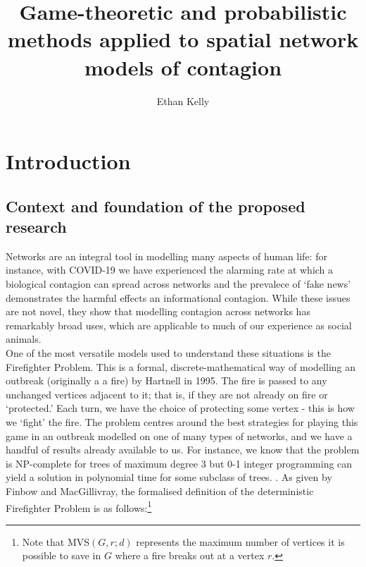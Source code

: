 \documentclass[hidelinks,a4paper,11pt]{article}
\makeatletter
\numberwithin{equation}{section}
\def\@supervisor{Dr Jessica Enright}
\newcommand{\supervisor}[1]{
  \def\@supervisor{#1}
}
\def\@studentid{}
\newcommand{\studentid}[1]{
  \def\@studentid{#1}
}
\makeatother
\begin{document}

\title{Game-theoretic and probabilistic methods applied to spatial network models of contagion}
\author{Ethan Kelly}
\supervisor{Dr Jessica Enright}
\studentid{2295664K@student.gla.ac.uk}




\newpage
{}

\section{Introduction}
\label{sec:intro}

\subsection{Context and foundation of the proposed research}

Networks are an integral tool in modelling many aspects of human life: for instance, with COVID-19 we have experienced the alarming rate at which a biological contagion can spread across networks and the prevalece of `fake news' demonstrates the harmful effects an informational contagion. While these issues are not novel, they show that modelling contagion across networks has remarkably broad uses, which are applicable to much of our experience as social animals.\\

One of the most versatile models used to understand these situations is the Firefighter Problem. This is a formal, discrete-mathematical way of modelling an outbreak (originally a a fire) by Hartnell in 1995. \cite{hartnell95} The fire is passed to any unchanged vertices adjacent to it; that is, if they are not already on fire or `protected.' Each turn, we have the choice of protecting some vertex - this is how we `fight' the fire. The problem centres around the best strategies for playing this game in an outbreak modelled on one of many types of networks, and we have a handful of results already available to us. For instance, we know that the problem is NP-complete for trees of maximum degree 3 \cite{finbow07} but 0-1 integer programming can yield a solution in polynomial time for some subclass of trees. \cite{macgillivray03}. As given by Finbow and MacGillivray, the formalised definition of the deterministic Firefighter Problem is as follows:\footnote{Note that MVS$(G, r; d)$ represents the maximum number of vertices it is possible to save in $G$ where a fire breaks out at a vertex $r$.}
\end{document}
